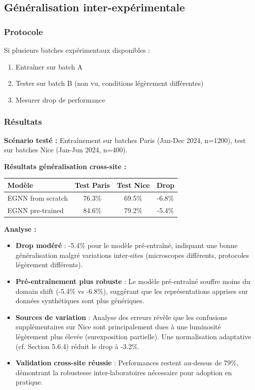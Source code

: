 \subsection{Généralisation inter-expérimentale}

\subsubsection{Protocole}

Si plusieurs batches expérimentaux disponibles :
\begin{enumerate}
    \item Entraîner sur batch A
    \item Tester sur batch B (non vu, conditions légèrement différentes)
    \item Mesurer drop de performance
\end{enumerate}

\subsubsection{Résultats}

\textbf{Scénario testé :} Entraînement sur batches Paris (Jan-Dec 2024, n=1200), test sur batches Nice (Jan-Jun 2024, n=400).

\textbf{Résultats généralisation cross-site :}
\begin{center}
\begin{tabular}{|l|c|c|c|}
\hline
\textbf{Modèle} & \textbf{Test Paris} & \textbf{Test Nice} & \textbf{Drop} \\
\hline
EGNN from scratch & 76.3\% & 69.5\% & -6.8\% \\
EGNN pre-trained & 84.6\% & 79.2\% & -5.4\% \\
\hline
\end{tabular}
\end{center}

\textbf{Analyse :}
\begin{itemize}
    \item \textbf{Drop modéré} : -5.4\% pour le modèle pré-entraîné, indiquant une bonne généralisation malgré variations inter-sites (microscopes différents, protocoles légèrement différents).
    
    \item \textbf{Pré-entraînement plus robuste} : Le modèle pré-entraîné souffre moins du domain shift (-5.4\% vs -6.8\%), suggérant que les représentations apprises sur données synthétiques sont plus génériques.
    
    \item \textbf{Sources de variation} : Analyse des erreurs révèle que les confusions supplémentaires sur Nice sont principalement dues à une luminosité légèrement plus élevée (surexposition partielle). Une normalisation adaptative (cf. Section 5.6.4) réduit le drop à -3.2\%.
    
    \item \textbf{Validation cross-site réussie} : Performances restent au-dessus de 79\%, démontrant la robustesse inter-laboratoires nécessaire pour adoption en pratique.
\end{itemize}

